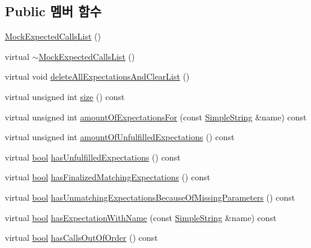 \subsection*{Public 멤버 함수}
\begin{DoxyCompactItemize}
\item 
\hyperlink{class_mock_expected_calls_list_ad769fd55a59b4c77e21561e28d8c1629}{Mock\+Expected\+Calls\+List} ()
\item 
virtual \hyperlink{class_mock_expected_calls_list_ae937d6e111090b83af6ed74b4ee34654}{$\sim$\+Mock\+Expected\+Calls\+List} ()
\item 
virtual void \hyperlink{class_mock_expected_calls_list_a1b991fee7b48dd24016188748b8c3b8d}{delete\+All\+Expectations\+And\+Clear\+List} ()
\item 
virtual unsigned int \hyperlink{class_mock_expected_calls_list_a90ca964ebcc1b02bbcde225edd49e812}{size} () const 
\item 
virtual unsigned int \hyperlink{class_mock_expected_calls_list_abccf9d0c2774fe798d64b1431b77e44a}{amount\+Of\+Expectations\+For} (const \hyperlink{class_simple_string}{Simple\+String} \&name) const 
\item 
virtual unsigned int \hyperlink{class_mock_expected_calls_list_aff4f9afb8dd7147c1fe467782e316757}{amount\+Of\+Unfulfilled\+Expectations} () const 
\item 
virtual \hyperlink{avb__gptp_8h_af6a258d8f3ee5206d682d799316314b1}{bool} \hyperlink{class_mock_expected_calls_list_a253f89ba986cb5c3db1c213f90806fbe}{has\+Unfulfilled\+Expectations} () const 
\item 
virtual \hyperlink{avb__gptp_8h_af6a258d8f3ee5206d682d799316314b1}{bool} \hyperlink{class_mock_expected_calls_list_aaf2a3bc73b6efb9e1971abf8981a1414}{has\+Finalized\+Matching\+Expectations} () const 
\item 
virtual \hyperlink{avb__gptp_8h_af6a258d8f3ee5206d682d799316314b1}{bool} \hyperlink{class_mock_expected_calls_list_aeed6547f5817eb530c06ddbfb2ea4103}{has\+Unmatching\+Expectations\+Because\+Of\+Missing\+Parameters} () const 
\item 
virtual \hyperlink{avb__gptp_8h_af6a258d8f3ee5206d682d799316314b1}{bool} \hyperlink{class_mock_expected_calls_list_abc07f8d24b76a0d76aba12c8307bf90f}{has\+Expectation\+With\+Name} (const \hyperlink{class_simple_string}{Simple\+String} \&name) const 
\item 
virtual \hyperlink{avb__gptp_8h_af6a258d8f3ee5206d682d799316314b1}{bool} \hyperlink{class_mock_expected_calls_list_a5fe56334ba5e10a4677844b62e7e69c4}{has\+Calls\+Out\+Of\+Order} () const 

\end{DoxyCompactItemize}
